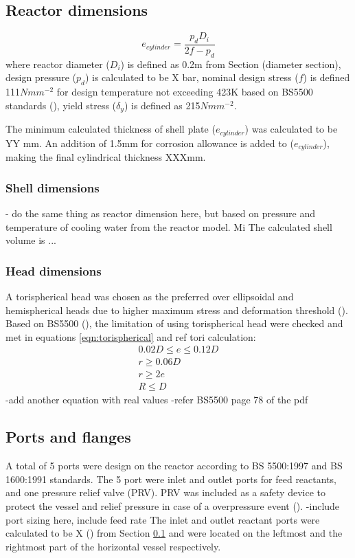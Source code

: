 \subsection{Reactor dimensions}
\label{sec:reactordimensions}

\begin{equation}
    e_{cylinder} = \frac{p_dD_i}{2f-p_d}
    \label{eqn:minthicknessreactor}
\end{equation}
where reactor diameter ($D_i$) is defined as 0.2m from Section (diameter section), design pressure ($p_d$) is calculated to be X bar, nominal design stress ($f$) is defined 111$Nmm^{-2}$ for design temperature not exceeding 423K based on BS5500 standards (), yield stress ($\delta_y$) is defined as 215$Nmm^{-2}$. 

The minimum calculated thickness of shell plate ($e_{cylinder}$) was calculated to be YY mm. An addition of 1.5mm for corrosion allowance is added to ($e_{cylinder}$), making the final cylindrical thickness XXXmm.
\subsubsection{Shell dimensions}
- do the same thing as reactor dimension here, but based on pressure and temperature of cooling water from the reactor model. Mi
The calculated shell volume is ...
\subsubsection{Head dimensions}
A torispherical head was chosen as the preferred over ellipsoidal and hemispherical heads due to higher maximum stress and deformation threshold (). 
Based on BS5500 (), the limitation of using torispherical head were checked and met in equations \ref{eqn:torispherical} and ref tori calculation:
\begin{equation}
    \begin{split}
        0.02D \leq e \leq 0.12D \\
        r \geq 0.06D \\
        r \geq 2e \\
        R \leq D
    \end{split}
    \label{eqn:torispherical}
\end{equation}
-add another equation with real values
-refer BS5500 page 78 of the pdf
\subsection{Ports and flanges}
A total of 5 ports were design on the reactor according to BS 5500:1997 and BS 1600:1991 standards. The 5 port were inlet and outlet ports for feed reactants, and one pressure relief valve (PRV). PRV was included as a safety device to protect the vessel and relief pressure in case of a overpressure event (). 
-include port sizing here, include feed rate
The inlet and outlet reactant ports were calculated to be X () from Section \ref{sec:reactordimensions} and were located on the leftmost and the rightmost part of the horizontal vessel respectively. 




